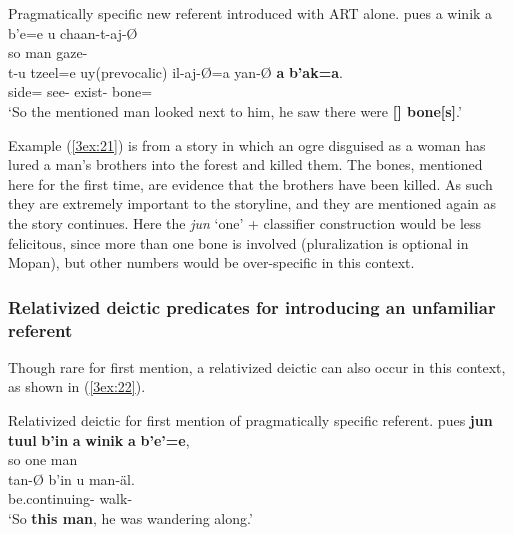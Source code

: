 \documentclass[output=paper]{langsci/langscibook}
\begin{document}
\begin{exe}
\ex\label{3ex:21}
Pragmatically specific new referent introduced with ART alone. 
\exi{}
\gll	pues	a 	winik	a 	b’e=e 			u 		chaan-t-aj-\O  \\
	so	{}	man	{}	{}		{}	gaze-{} \\
\glt
\exi{}
\gll	t-u  			tzeel=e 		uy(prevocalic) 	il-aj-\O=a  yan-{\O} 		{\bf{a}} 	{\bf{b'ak=a}}.\\
	{}	side={} 	{} 		see-{}  exist-{} 	{}		bone={} \\
\glt	`So the mentioned man looked next to him, he saw there were {\bf{[{}] bone[s]}}.'
\end{exe}

Example (\ref{3ex:21}) is from a story in which an ogre disguised as a woman has lured a man's brothers into the forest and killed them.  The bones, mentioned here for the first time, are evidence that the brothers have been killed. As such they are extremely important to the storyline, and they are mentioned again as the story continues.  Here the {\emph{jun}} `one' + classifier construction would be less felicitous, since more than one bone is involved (pluralization is optional in Mopan), but other numbers would be over-specific in this context.  


\subsubsection{Relativized deictic predicates for introducing an unfamiliar referent}\label{3sec:332}

Though rare for first mention, a relativized deictic can also occur in this context, as shown in (\ref{3ex:22}).

\begin{exe}
\ex\label{3ex:22}
Relativized deictic for first mention of pragmatically specific referent. 
\exi{}
\gll	pues 	{\bf{jun}} 	{\bf{tuul}} 		{\bf{b'in}} 		{\bf{a}} 	{\bf{winik}} 	{\bf{a}}	{\bf{b'e'=e}}, \\
	so		one		{}	{}		{\sc{art}}	man			{}	{} \\
\glt
\exi{}
\gll	tan-{\O} 				b'in 			u 		man-\"al. \\
	be.continuing-{}	{}		{}	walk-{} \\
\glt	`So {\bf{this man}}, he was wandering along.'
\end{exe}
\end{document}
